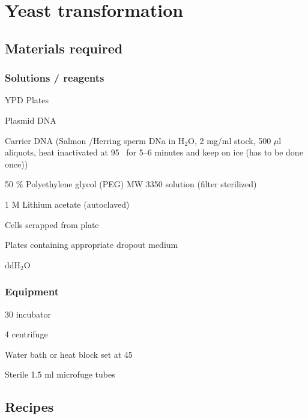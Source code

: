 	\chapter{Yeast transformation}
	 \newpage
	\setlength{\parindent}{0pt}
	\setcounter{secnumdepth}{5}
	\setcounter{section}{0}
	\renewcommand*{\theHsection}{trans.\the\value{section}}
	\section {Materials required}
		\subsection{Solutions / reagents}
				\begin{packed_enum}
					\item YPD Plates
					\item Plasmid DNA
					\item Carrier DNA {} (Salmon /Herring sperm DNa in H$_ 2 $O, 2 mg/ml stock, 500 $\mu$l aliquots, heat inactivated at 95 \textcelsius\ for 5--6 minutes and keep on ice (has to be done once))
					\item 50 \% Polyethylene glycol (PEG) MW 3350 solution (filter sterilized)
					\item 1 M Lithium acetate (autoclaved)
					\item Cells scrapped from plate
					\item Plates containing appropriate dropout medium
					\item ddH$_ 2 $O
						\end{packed_enum}
		\subsection{Equipment}
				\begin{packed_enum}
					\item 30 {\textcelsius} incubator
					\item 4 {\textcelsius} centrifuge
					\item Water bath or heat block set at 45 \textcelsius
					\item Sterile 1.5 ml microfuge tubes
				\end{packed_enum}
	 \section {Recipes}


